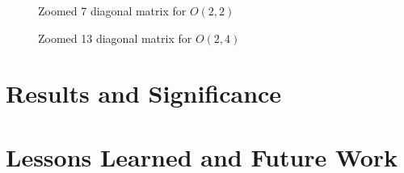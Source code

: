 \documentclass[12pt,a4paper]{report}
\begin{document}
\begin{figure}[h!]
\begin{minipage}[h!]{0.49\textwidth}
  	\caption{Zoomed 7 diagonal matrix for $O(2,2)$}
  	\label{fig:m22}
\end{minipage}
\hfill
\begin{minipage}[h!]{0.49\textwidth}
  	\caption{Zoomed 13 diagonal matrix for $O(2,4)$}
  	\label{fig:m24}
\end{minipage}
\end{figure}

\section*{Results and Significance}

\section*{Lessons Learned and Future Work}


\end{document}
